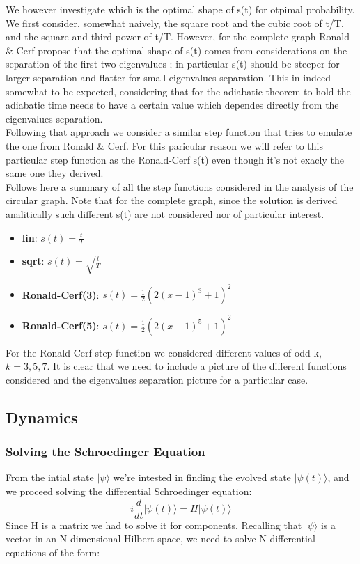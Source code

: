 We however investigate which is the optimal shape of s(t) for otpimal probability. We first consider, somewhat naively, the square root and the cubic root of t/T, and the square and third power of t/T. However, for the complete graph Ronald \& Cerf propose that the optimal shape of s(t) comes from considerations on the separation of the first two eigenvalues \cite{Roland2002}; in particular s(t) should be steeper for larger separation and flatter for small eigenvalues separation. This in indeed somewhat to be expected, considering that for the adiabatic theorem to hold the adiabatic time needs to have a certain value which dependes directly from the eigenvalues separation. \\
Following that approach we consider a similar step function that tries to emulate the one from Ronald \& Cerf. For this paricular reason we will refer to this particular step function as the Ronald-Cerf s(t) even though it's not exacly the same one they derived. \\


Follows here a summary of all the step functions considered in the analysis of the circular graph. Note that for the complete graph, since the solution is derived analitically such different s(t) are not considered nor of particular interest.
  \begin{itemize}
    \item \textbf{lin}: $s(t) = \frac{t}{T}$
    \item \textbf{sqrt}: $s(t) = \sqrt{\frac{t}{T}}$
    \item \textbf{Ronald-Cerf(3)}: $s(t) = \frac{1}{2}(2(x-1)^{3}+1)^2$
    \item \textbf{Ronald-Cerf(5)}: $s(t) = \frac{1}{2}(2(x-1)^{5}+1)^2$
  \end{itemize}
For the Ronald-Cerf step function we considered different values of odd-k, $k=3,5,7$. It is clear that we need to include a picture of the different functions considered and the eigenvalues separation picture for a particular case.



\subsection{Dynamics}
\subsubsection*{Solving the Schroedinger Equation}
From the intial state $|\psi\rangle$ we're intested in finding the evolved state $|\psi(t)\rangle$, and we proceed solving the differential Schroedinger equation:
  \begin{equation}
    i\frac{d}{dt}|\psi(t)\rangle = H |\psi(t)\rangle
  \end{equation}
Since H is a matrix we had to solve it for components. Recalling that $|\psi\rangle$ is a vector in an N-dimensional Hilbert space, we need to solve N-differential equations of the form:

